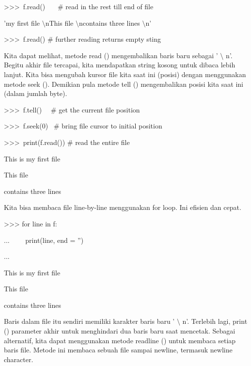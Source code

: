 \noindent 
>>>~f.read()~~~   $  \#  $ read in the rest till end of file \par
\noindent 
'my first file $  \setminus  $nThis file $  \setminus  $ncontains three lines $  \setminus  $n' \par
\vspace{12pt}
\noindent 
>>>~f.read()   $  \#  $ further reading returns empty sting \par
\vspace{12pt}
Kita dapat melihat, metode read () mengembalikan baris baru sebagai ' $  \setminus  $ n'. Begitu akhir file tercapai, kita mendapatkan string kosong untuk dibaca lebih lanjut. Kita bisa mengubah kursor file kita saat ini (posisi) dengan menggunakan metode seek (). Demikian pula metode tell () mengembalikan posisi kita saat ini (dalam jumlah byte). \par
\vspace{12pt}
\noindent 
>>>~f.tell()~~   $  \#  $ get the current file position \par
{} \par
\vspace{12pt}
\noindent 
>>>~f.seek(0)~   $  \#  $ bring file cursor to initial position \par
{} \par
\vspace{12pt}
\noindent 
>>>~print(f.read())   $  \#  $ read the entire file \par
\noindent 
This is my first file \par
\noindent 
This file \par
\noindent 
contains three lines \par
\vspace{12pt}
\vspace{12pt}
\noindent 
Kita bisa membaca file line-by-line menggunakan for loop. Ini efisien dan cepat. \par
\vspace{12pt}
\noindent 
>>> for line in f: \par
\noindent 
...~~~~ print(line, end = '') \par
\noindent 
... \par
\noindent 
This is my first file \par
\noindent 
This file \par
\noindent 
contains three lines \par
Baris dalam file itu sendiri memiliki karakter baris baru ' $  \setminus  $ n'. Terlebih lagi, print () parameter akhir untuk menghindari dua baris baru saat mencetak. Sebagai alternatif, kita dapat menggunakan metode readline () untuk membaca setiap baris file. Metode ini membaca sebuah file sampai newline, termasuk newline character. \par
